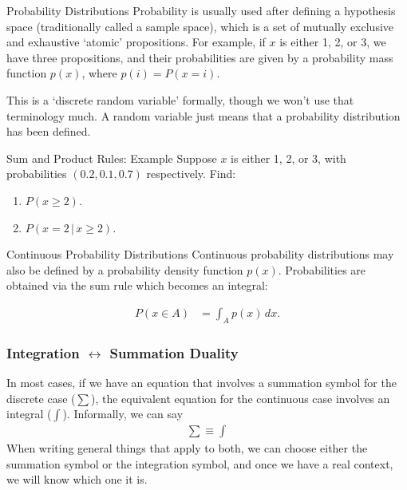\documentclass{beamer}
\newcommand{\given}{\,|\,}
\begin{document}
\begin{frame}{Probability Distributions}
Probability is usually used after defining a hypothesis space
(traditionally called a sample space), which is a set of mutually
exclusive and exhaustive `atomic' propositions. For example,
if $x$ is either 1, 2, or 3, we have three propositions,
and their probabilities are given by a probability mass
function $p(x)$, where $p(i) = P(x = i)$.\pause

This is a `discrete random variable' formally, though we won't
use that terminology much. A random variable just means
that a probability distribution has been defined.
\end{frame}

\begin{frame}{Sum and Product Rules: Example}
Suppose $x$ is either 1, 2, or 3, with probabilities
$(0.2, 0.1, 0.7)$ respectively. Find:
\begin{enumerate}
\item[(a)] $P(x \geq 2)$.
\item[(b)] $P(x = 2 \given x \geq 2)$.
\end{enumerate}

\end{frame}

\begin{frame}{Continuous Probability Distributions}
Continuous probability distributions may also be defined
by a probability density function $p(x)$. Probabilities
are obtained via the sum rule which becomes an integral:

\begin{align}
P(x \in A) &= \int_A p(x) \, dx.
\end{align}

\end{frame}

\begin{frame}
\frametitle{Integration $\leftrightarrow$ Summation Duality}
In most cases, if we have an equation that involves a summation symbol
for the discrete case ($\sum$), the equivalent equation for the continuous
case involves an integral ($\int$).
Informally, we can say
\begin{align}
\sum \equiv \int
\end{align}\pause
When writing general things that apply to both, we can choose either the
summation symbol or the integration symbol, and once we have a real context,
we will know which one it is.

\end{frame}
\end{document}

